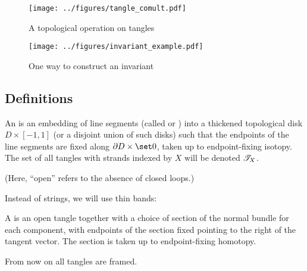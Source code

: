 \documentclass{beamer}
\begin{document}
\begin{frame}
\begin{figure}
        \centering
        \texttt{[image: ../figures/tangle\_comult.pdf]}
        \caption{A topological operation on tangles}
        \label{fig:tangle_comult_example}
\end{figure}
\end{frame}

\begin{frame}
        \begin{figure}
                \centering
                \texttt{[image: ../figures/invariant\_example.pdf]}
                \caption{One way to construct an invariant}
                \label{fig:invariant_example}
        \end{figure}
\end{frame}

\subsection{Definitions}

\begin{frame}
        \begin{definition}
                An  is an embedding of line segments (called
                 or ) into a thickened
                topological disk $D \times [-1,1]$ (or a disjoint union of such
                disks) such that the endpoints of the line segments are fixed
                along $\boundary D \times \set0$, taken up to endpoint-fixing
                isotopy.
                \pause
                The set of all tangles with strands indexed by $X$ will be
                denoted $\mathscr{T}_{X}$.
        \end{definition}
        \pause
        (Here, \enquote{open} refers to the absence of closed loops.)
\end{frame}

\begin{frame}
        Instead of strings, we will use thin bands:
        \pause
        \begin{definition}
                A  is an open tangle together with a choice
                of section of the normal bundle for each component, with
                endpoints of the section fixed pointing to the right of the
                tangent vector. The section is taken up to endpoint-fixing
                homotopy.
        \end{definition}
        \pause
        From now on all tangles are framed.
\end{frame}
\end{document}
